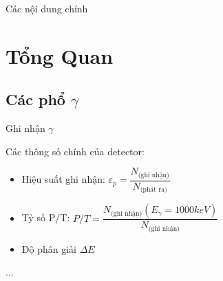 \documentclass[11pt, hyperref={unicode}]{beamer}%
\begin{document}
\begin{frame}
{	}%
	\titlepage
	\initclock%
\end{frame}

\logo{}%

\begin{frame}{Các nội dung chính}
	\tableofcontents
\end{frame}


\section{Tổng Quan}

\subsection{Các phổ $\gamma$}

\begin{frame}[label = ghinhan]{Ghi nhận $\gamma$}%

Các thông số chính của detector:

\begin{itemize}
\item<2-> Hiệu suất ghi nhận: $\varepsilon_{p} = \dfrac{N_\text{(ghi nhận)}}{N_\text{(phát ra)}}$

\item<3-> Tỷ số P/T: $P/T = \dfrac{N_\text{(ghi nhận)}(E_{\gamma} = 1000 keV)}{N_\text{(ghi nhận)}}$

\item<4-> Độ phân giải $\Delta E$

\end{itemize}


\end{frame}%

...
\end{document}
